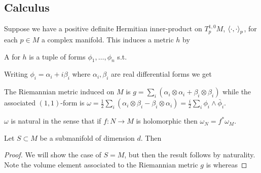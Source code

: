 \documentclass{article}
\begin{document}
\subsection{Calculus}
Suppose we have a positive definite Hermitian inner-product on $T^{1,0}_pM$, $\left\langle \cdot,\cdot \right\rangle_p$, for each $p\in M$ a complex manifold. This induces a metric $h$ by 
\begin{definition}
	A  for $h$ is a tuple of forms $\phi_1, \dots, \phi_n$ s.t. 
\end{definition}
Writing $\phi_i = \alpha_i + i \beta_i $ where $\alpha_i,\beta_i$ are real differential forms we get 
\begin{notation}
	The Riemannian metric induced on $M$ is $g = \sum_i (\alpha_i \otimes \alpha_i + \beta_i \otimes \beta_i)$ while the associated $(1,1)$-form is $\omega = \frac{1}{2}\sum_i (\alpha_i \otimes\beta_i - \beta_i \otimes \alpha_i) = \frac{i}{2} \sum_i \phi_i \wedge \bar{\phi}_i$. 
\end{notation}

\begin{lemma}
	$\omega$ is natural in the sense that if $f:N \to M$ is holomorphic then $\omega_N = f^\ast \omega_M$. 
\end{lemma}

\begin{theorem}[Wirtinger]
	Let $S \subset M$ be a submanifold of dimension $d$. Then 
\end{theorem}
\begin{proof}
	We will show the case of $S=M$, but then the result follows by naturality. Note the volume element associated to the Riemannian metric $g$ is 
whereas 
\end{proof}

\end{document}
